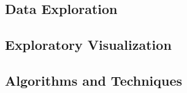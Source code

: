 \documentclass[a4paper,10pt]{article}
\begin{document}
\subsection{Data Exploration}

\subsection{Exploratory Visualization}

\subsection{Algorithms and Techniques}
\end{document}
